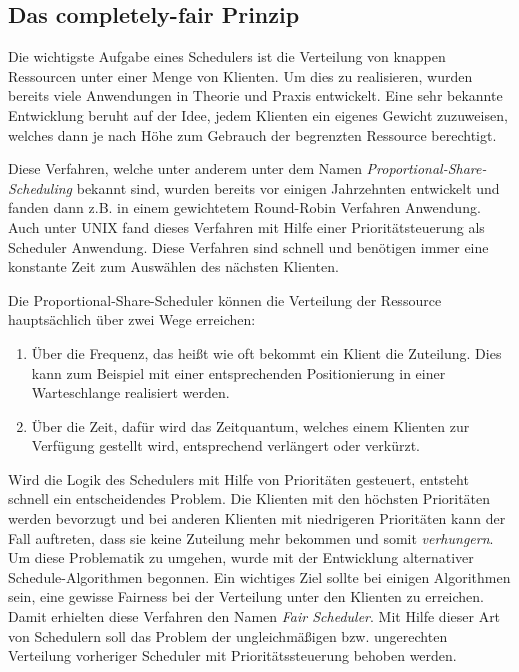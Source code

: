 \subsection{Das completely-fair Prinzip}\label{s:fair}
Die wichtigste Aufgabe eines Schedulers ist die Verteilung von knappen Ressourcen unter einer Menge von Klienten. 
Um dies zu realisieren, wurden bereits viele Anwendungen in Theorie und Praxis entwickelt.
Eine sehr bekannte Entwicklung beruht auf der Idee, jedem Klienten ein eigenes Gewicht zuzuweisen, welches dann je nach Höhe zum Gebrauch der begrenzten Ressource berechtigt.

Diese Verfahren, welche unter anderem unter dem Namen \textit{Proportional-Share-Scheduling} bekannt sind, wurden bereits vor einigen Jahrzehnten entwickelt und fanden dann z.B. in einem gewichtetem Round-Robin Verfahren Anwendung. Auch unter UNIX fand dieses Verfahren  mit Hilfe einer Prioritätsteuer\-ung als Scheduler Anwendung. Diese Verfahren sind schnell und benötigen immer eine konstante Zeit zum Auswählen des nächsten Klienten. 

Die Proportional-Share-Scheduler können die Verteilung der Ressource hauptsächlich über zwei Wege erreichen:
\begin{enumerate}
	\item Über die Frequenz, das heißt wie oft bekommt ein Klient die Zuteilung. Dies kann zum Beispiel mit einer entsprechenden Positionierung in einer Warteschlange realisiert werden.
	\item Über die Zeit, dafür wird das Zeitquantum, welches einem Klienten zur Verfügung gestellt wird, entsprechend verlängert oder verkürzt.
\end{enumerate}

Wird die Logik des Schedulers mit Hilfe von Prioritäten gesteuert, entsteht schnell ein entscheidendes Problem. Die Klienten mit den höchsten Prioritäten werden bevorzugt und bei anderen Klienten mit niedrigeren Prioritäten kann der Fall auftreten, dass sie keine Zuteilung mehr bekommen und somit \textit{verhungern}.
Um diese Problematik zu umgehen, wurde mit der Entwicklung alternativer Schedule-Algorithmen begonnen. Ein wichtiges Ziel sollte bei einigen Algorithmen sein, eine gewisse Fairness bei der Verteilung unter den Klienten zu erreichen. Damit erhielten diese Verfahren den Namen \textit{Fair Scheduler}. Mit Hilfe dieser Art von Schedulern soll das Problem der ungleich\-mäßigen bzw. ungerechten Verteilung vorheriger Scheduler mit Prioritäts\-steuer\-ung  behoben werden.

